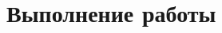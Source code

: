 \documentclass[../main/main.tex]{subfiles}
\begin{document}
    \newpage
    \section{Выполнение работы}
    \label{sec:results}
\end{document}

